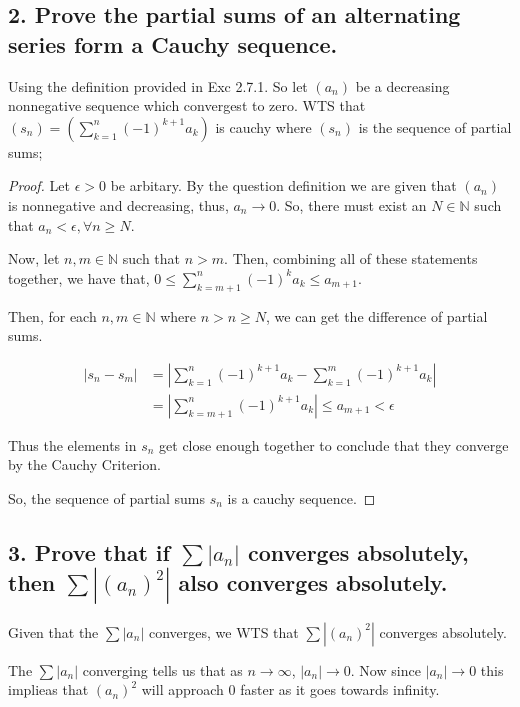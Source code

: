 \documentclass{article}
\begin{document}
\subsection*{2. Prove the partial sums of an alternating series form a Cauchy sequence.}

Using the definition provided in Exc 2.7.1. So let $(a_n)$ be a decreasing nonnegative sequence which 
convergest to zero. WTS that $(s_n) = (\sum_{k=1}^{n} (-1)^{k+1}a_k)$ is cauchy where $(s_n)$ is the sequence 
of partial sums;

\begin{proof}

    Let $\epsilon > 0$ be arbitary. By the question definition we are given that $(a_n)$ is nonnegative and decreasing, thus, 
    $a_n \rightarrow 0$. So, there must exist an $N \in \mathbb{N}$ such that $a_n < \epsilon, \forall n \ge N$.

    Now, let $n,m \in \mathbb{N}$ such that $n > m$. Then, combining all of these statements together, we have that,
    $0 \le \sum_{k=m+1}^{n}(-1)^k a_k \le a_{m+1}$.

    Then, for each $n,m \in \mathbb{N}$ where $n > n \ge N$, we can get the difference of partial sums.

    \begin{align*}
        |s_n - s_m| &= |\sum_{k=1}^{n}(-1)^{k+1}a_k - \sum_{k=1}^{m}(-1)^{k+1}a_k| \\
                    &= |\sum_{k=m+1}^{n}(-1)^{k+1}a_k| \le a_{m+1} < \epsilon
    \end{align*}

    Thus the elements in $s_n$ get close enough together to conclude that they converge by the Cauchy Criterion.

    So, the sequence of partial sums $s_n$ is a cauchy sequence.

\end{proof}




\subsection*{3. Prove that if $\sum |a_n|$ converges absolutely, then $\sum |(a_n)^2|$ also converges absolutely.}

Given that the $\sum |a_n|$ converges, we WTS that $\sum |(a_n)^2|$ converges absolutely.

The $\sum |a_n|$ converging tells us that as $n \rightarrow \infty$, $|a_n| \rightarrow 0$. Now 
since $|a_n| \rightarrow 0$ this implieas that $(a_n)^2$ will approach 0 faster as it goes towards infinity.
\end{document}

